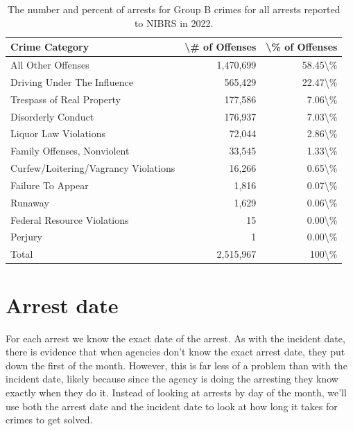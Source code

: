 \documentclass[
  12pt,
  openany]{book}
\begin{document}
\begin{longtable}[t]{lrr}
\caption{\label{tab:GroupBarresteeCrime}The number and percent of arrests for Group B crimes for all arrests reported to NIBRS in 2022.}\\
\toprule
Crime Category & \textbackslash{}\# of Offenses & \textbackslash{}\% of Offenses\\
\midrule
All Other Offenses & 1,470,699 & 58.45\textbackslash{}\%\\
Driving Under The Influence & 565,429 & 22.47\textbackslash{}\%\\
Trespass of Real Property & 177,586 & 7.06\textbackslash{}\%\\
Disorderly Conduct & 176,937 & 7.03\textbackslash{}\%\\
Liquor Law Violations & 72,044 & 2.86\textbackslash{}\%\\
\addlinespace
Family Offenses, Nonviolent & 33,545 & 1.33\textbackslash{}\%\\
Curfew/Loitering/Vagrancy Violations & 16,266 & 0.65\textbackslash{}\%\\
Failure To Appear & 1,816 & 0.07\textbackslash{}\%\\
Runaway & 1,629 & 0.06\textbackslash{}\%\\
Federal Resource Violations & 15 & 0.00\textbackslash{}\%\\
\addlinespace
Perjury & 1 & 0.00\textbackslash{}\%\\
Total & 2,515,967 & 100\textbackslash{}\%\\
\bottomrule
\end{longtable}

\section{Arrest date}\label{arrest-date}

For each arrest we know the exact date of the arrest. As with the incident date, there is evidence that when agencies don't know the exact arrest date, they put down the first of the month. However, this is far less of a problem than with the incident date, likely because since the agency is doing the arresting they know exactly when they do it. Instead of looking at arrests by day of the month, we'll use both the arrest date and the incident date to look at how long it takes for crimes to get solved.
\end{document}
